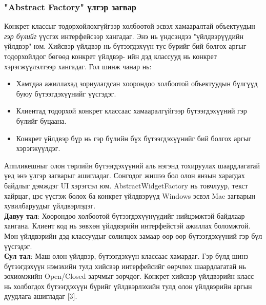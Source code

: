 \subsubsection{"Abstract Factory" үлгэр загвар}
\quad \quad Конкрет классыг тодорхойлохгүйгээр холбоотой эсвэл хамааралтай объектуудын \textit{гэр бүлийг} үүсгэх интерфейсээр хангадаг. Энэ нь үндсэндээ "үйлдвэрүүдийн үйлдвэр" юм. Хийсвэр үйлдвэр нь бүтээгдэхүүн тус бүрийг бий болгох аргыг тодорхойлдог бөгөөд конкрет үйлдвэр- ийн дэд классууд нь конкрет хэрэгжүүлэлтээр хангадаг. Гол шинж чанар нь:
\begin{itemize}
	\item Хамтдаа ажиллахад зориулагдсан хоорондоо холбоотой объектуудын бүлгүүд буюу бүтээгдэхүүнийг үүсгэдэг.
	\item Клиентад тодорхой конкрет классаас хамааралгүйгээр бүтээгдэхүүний гэр бүлийг буцаана.
	\item Конкрет үйлдвэр бүр нь гэр бүлийн бүх бүтээгдэхүүнийг бий болгох аргыг хэрэгжүүлдэг.
\end{itemize}
Аппликешныг олон төрлийн бүтээгдэхүүний аль нэгэнд тохируулах шаардлагатай үед энэ үлгэр загварыг ашигладаг. Сонгодог жишээ бол олон янзын харагдах байдлыг дэмждэг UI хэрэгсэл юм. AbstractWidgetFactory нь товчлуур, текст хайрцаг, цэс үүсгэж болох ба конкрет үйлдвэрүүд Windows эсвэл Mac загварын хувилбаруудыг үйлдвэрлэдэг.\\
\textbf{Давуу тал}: Хоорондоо холбоотой бүтээгдэхүүнүүдийг нийцэмжтэй байдлаар хангана. Клиент код нь зөвхөн үйлдвэрийн интерфейстэй ажиллах боломжтой. Мөн үйлдвэрийн дэд классуудыг солилцох замаар өөр өөр бүтээгдэхүүний гэр бүл үүсгэдэг. \\
\textbf{Сул тал}: Маш олон үйлдвэр, бүтээгдэхүүн классаас хамардаг. Гэр бүлд шинэ бүтээгдэхүүн нэмэхийн тулд хийсвэр интерфейсийг өөрчлөх шаардлагатай нь зохиомжийн Open/Closed зарчмыг зөрчдөг. Конкрет хийсвэр үйлдвэрийн класс нь холбогдох бүтээгдэхүүн бүрийг үйлдвэрлэхийн тулд олон үйлдвэрийн аргын дуудлага ашигладаг [3].

